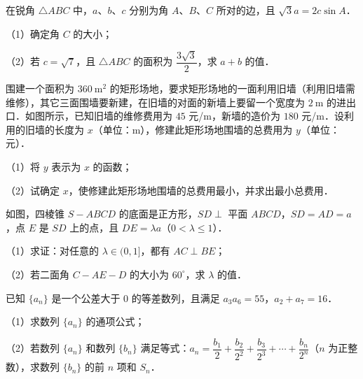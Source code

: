 \begin{question}
在锐角 $\triangle ABC$ 中，$a$、$b$、$c$ 分别为角 $A$、$B$、$C$ 所对的边，且 $\sqrt3a=2c\sin A$．

（1）确定角 $C$ 的大小；

（2）若 $c=\sqrt7$，且 $\triangle ABC$ 的面积为 $\dfrac{3\sqrt3}{2}$，求 $a+b$ 的值．

\Needspace{0.4\textheight}
\end{question}
\begingroup
\renewenvironment{question}{\Needspace{0.5\textheight}}{}
\begin{question}
围建一个面积为 $360\ \mathrm{m^2}$ 的矩形场地，要求矩形场地的一面利用旧墙（利用旧墙需维修），其它三面围墙要新建，在旧墙的对面的新墙上要留一个宽度为 $2\ \mathrm m$ 的进出口．如图所示，已知旧墙的维修费用为 $45$ 元/m，新墙的造价为 $180$ 元/m．设利用的旧墙的长度为 $x$（单位：m），修建此矩形场地围墙的总费用为 $y$（单位：元）．

（1）将 $y$ 表示为 $x$ 的函数；

（2）试确定 $x$，使修建此矩形场地围墙的总费用最小，并求出最小总费用．
\nopagebreak[4]
\begin{center}\end{center}
\nopagebreak[4]
\Needspace{0.4\textheight}
\end{question}
\endgroup
\begingroup
\renewenvironment{question}{\Needspace{0.5\textheight}}{}
\begin{question}
如图，四棱锥 $S-ABCD$ 的底面是正方形，$SD\perp$ 平面 $ABCD$，$SD=AD=a$，点 $E$ 是 $SD$ 上的点，且 $DE=\lambda a$（$0<\lambda\leqslant1$）．

（1）求证：对任意的 $\lambda\in(0,1]$，都有 $AC\perp BE$；

（2）若二面角 $C-AE-D$ 的大小为 $60^\circ$，求 $\lambda$ 的值．
\nopagebreak[4]
\begin{center}\end{center}
\nopagebreak[4]
\end{question}
\endgroup
\begin{question}
已知 $\{a_n\}$ 是一个公差大于 $0$ 的等差数列，且满足 $a_3a_6=55$，$a_2+a_7=16$．

（1）求数列 $\{a_n\}$ 的通项公式；

（2）若数列 $\{a_n\}$ 和数列 $\{b_n\}$ 满足等式：$a_n=\dfrac{b_1}{2}+\dfrac{b_2}{2^2}+\dfrac{b_3}{2^3}+\cdots+\dfrac{b_n}{2^n}$（$n$ 为正整数），求数列 $\{b_n\}$ 的前 $n$ 项和 $S_n$．

\Needspace{0.4\textheight}
\end{question}
